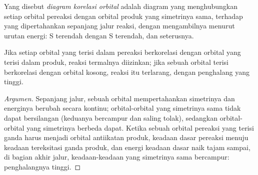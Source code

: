 \begin{definition}\label{def:b3:pericyclic:orbital-correlation}
Yang disebut \emph{diagram korelasi orbital} adalah diagram yang menghubungkan
setiap orbital pereaksi dengan orbital produk yang simetrinya sama,
terhadap  yang dipertahankan sepanjang jalur reaksi, dengan mengambilnya
menurut urutan energi: S terendah dengan S terendah, dan seterusnya.
\end{definition}

\begin{proposition}\label{prop:b3:pericyclic:correlation}
Jika setiap orbital yang terisi dalam pereaksi berkorelasi dengan orbital yang terisi dalam
produk, reaksi termalnya diizinkan; jika sebuah orbital terisi berkorelasi
dengan orbital kosong, reaksi itu terlarang, dengan penghalang yang tinggi.
\end{proposition}

\begin{proof}[Argumen]
Sepanjang jalur, sebuah orbital mempertahankan simetrinya dan energinya berubah
secara kontinu; orbital-orbital yang simetrinya sama tidak dapat bersilangan (keduanya bercampur dan saling tolak),
sedangkan orbital-orbital yang simetrinya berbeda dapat. Ketika sebuah orbital pereaksi yang terisi ganda
harus menjadi orbital antiikatan produk, keadaan dasar
pereaksi menuju keadaan tereksitasi ganda produk, dan energi keadaan dasar
naik tajam sampai, di bagian akhir jalur, keadaan-keadaan yang simetrinya sama
bercampur: penghalangnya tinggi.
\end{proof}

